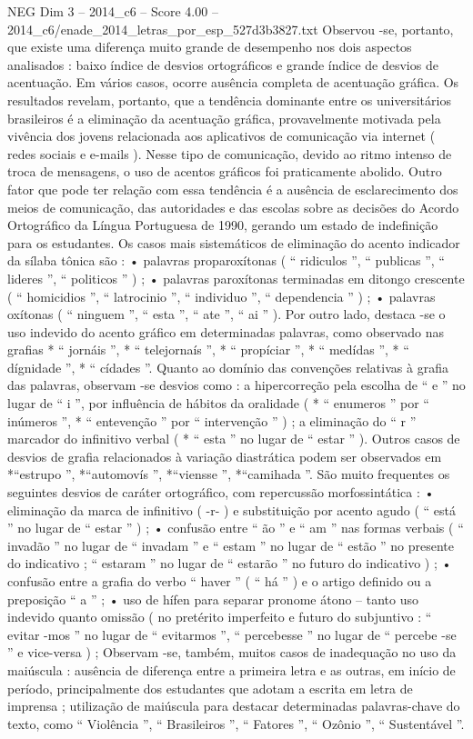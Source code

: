 \begin{textsample}{NEG Dim 3 – 2014\_c6 – Score 4.00 – 2014\_c6/enade\_2014\_letras\_por\_esp\_527d3b3827.txt}
Observou -se, portanto, que existe uma diferença muito grande de desempenho nos dois aspectos analisados : baixo índice de desvios ortográficos e grande índice de desvios de acentuação.
Em vários casos, ocorre ausência completa de acentuação gráfica.
Os resultados revelam, portanto, que a tendência dominante entre os universitários brasileiros é a eliminação da acentuação gráfica, provavelmente motivada pela vivência dos jovens relacionada aos aplicativos de comunicação via internet ( redes sociais e e-mails ).
Nesse tipo de comunicação, devido ao ritmo intenso de troca de mensagens, o uso de acentos gráficos foi praticamente abolido.
Outro fator que pode ter relação com essa tendência é a ausência de esclarecimento dos meios de comunicação, das autoridades e das escolas sobre as decisões do Acordo Ortográfico da Língua Portuguesa de 1990, gerando um estado de indefinição para os estudantes.
Os casos mais sistemáticos de eliminação do acento indicador da sílaba tônica são : • palavras proparoxítonas ( “ ridiculos ”, “ publicas ”, “ lideres ”, “ politicos ” ) ; • palavras paroxítonas terminadas em ditongo crescente ( “ homicidios ”, “ latrocinio ”, “ individuo ”, “ dependencia ” ) ; • palavras oxítonas ( “ ninguem ”, “ esta ”, “ ate ”, “ ai ” ).
Por outro lado, destaca -se o uso indevido do acento gráfico em determinadas palavras, como observado nas grafias * “ jornáis ”, * “ telejornaís ”, * “ propíciar ”, * “ medídas ”, * “ dígnidade ”, * “ cídades ”.
Quanto ao domínio das convenções relativas à grafia das palavras, observam -se desvios como : a hipercorreção pela escolha de “ e ” no lugar de “ i ”, por influência de hábitos da oralidade ( * “ enumeros ” por “ inúmeros ”, * “ entevenção ” por “ intervenção ” ) ; a eliminação do “ r ” marcador do infinitivo verbal ( * “ esta ” no lugar de “ estar ” ).
Outros casos de desvios de grafia relacionados à variação diastrática podem ser observados em *“estrupo ”, *“automovís ”, *“viensse ”, *“camihada ”.
São muito frequentes os seguintes desvios de caráter ortográfico, com repercussão morfossintática : • eliminação da marca de infinitivo ( -r- ) e substituição por acento agudo ( “ está ” no lugar de “ estar ” ) ; • confusão entre “ ão ” e “ am ” nas formas verbais ( “ invadão ” no lugar de “ invadam ” e “ estam ” no lugar de “ estão ” no presente do indicativo ; “ estaram ” no lugar de “ estarão ” no futuro do indicativo ) ; • confusão entre a grafia do verbo “ haver ” ( “ há ” ) e o artigo definido ou a preposição “ a ” ; • uso de hífen para separar pronome átono – tanto uso indevido quanto omissão ( no pretérito imperfeito e futuro do subjuntivo : “ evitar -mos ” no lugar de “ evitarmos ”, “ percebesse ” no lugar de “ percebe -se ” e vice-versa ) ; Observam -se, também, muitos casos de inadequação no uso da maiúscula : ausência de diferença entre a primeira letra e as outras, em início de período, principalmente dos estudantes que adotam a escrita em letra de imprensa ; utilização de maiúscula para destacar determinadas palavras-chave do texto, como “ Violência ”, “ Brasileiros ”, “ Fatores ”, “ Ozônio ”, “ Sustentável ”.

\end{textsample}
